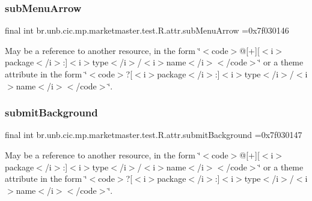 \subsubsection{\texorpdfstring{sub\+Menu\+Arrow}{subMenuArrow}}
{\footnotesize\ttfamily final int br.\+unb.\+cic.\+mp.\+marketmaster.\+test.\+R.\+attr.\+sub\+Menu\+Arrow =0x7f030146\hspace{0.3cm}{\ttfamily [static]}}

May be a reference to another resource, in the form \char`\"{}$<$code$>$@\mbox{[}+\mbox{]}\mbox{[}$<$i$>$package$<$/i$>$\+:\mbox{]}$<$i$>$type$<$/i$>$/$<$i$>$name$<$/i$>$$<$/code$>$\char`\"{} or a theme attribute in the form \char`\"{}$<$code$>$?\mbox{[}$<$i$>$package$<$/i$>$\+:\mbox{]}$<$i$>$type$<$/i$>$/$<$i$>$name$<$/i$>$$<$/code$>$\char`\"{}. \mbox{\label{classbr_1_1unb_1_1cic_1_1mp_1_1marketmaster_1_1test_1_1R_1_1attr_aa15bdbee970b637758c86ed3b50319ea}} 
\subsubsection{\texorpdfstring{submit\+Background}{submitBackground}}
{\footnotesize\ttfamily final int br.\+unb.\+cic.\+mp.\+marketmaster.\+test.\+R.\+attr.\+submit\+Background =0x7f030147\hspace{0.3cm}{\ttfamily [static]}}

May be a reference to another resource, in the form \char`\"{}$<$code$>$@\mbox{[}+\mbox{]}\mbox{[}$<$i$>$package$<$/i$>$\+:\mbox{]}$<$i$>$type$<$/i$>$/$<$i$>$name$<$/i$>$$<$/code$>$\char`\"{} or a theme attribute in the form \char`\"{}$<$code$>$?\mbox{[}$<$i$>$package$<$/i$>$\+:\mbox{]}$<$i$>$type$<$/i$>$/$<$i$>$name$<$/i$>$$<$/code$>$\char`\"{}. \mbox{\label{classbr_1_1unb_1_1cic_1_1mp_1_1marketmaster_1_1test_1_1R_1_1attr_a2391cc23ec9655341b074bbefa0b73dd}} 
